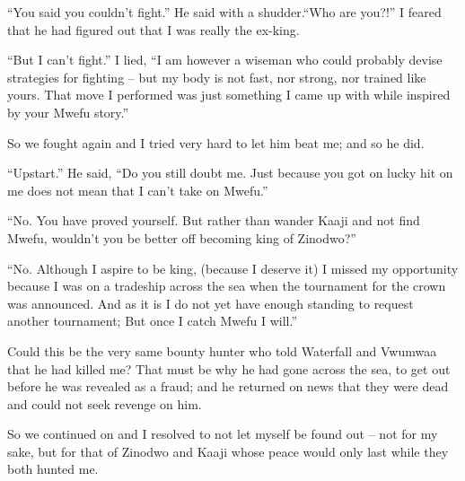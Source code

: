 ``You said you couldn't fight.'' He said with a shudder.``Who are you?!'' I feared that he had figured out that I was really the ex-king.

``But I can't fight.'' I lied, ``I am however a wiseman who could probably devise strategies for fighting -- but my body is not fast, nor strong, nor trained like yours. That move I performed was just something I came up with while inspired by your Mwefu story.''

So we fought again and I tried very hard to let him beat me; and so he did.

``Upstart.'' He said, ``Do you still doubt me. Just because you got on lucky hit on me does not mean that I can't take on Mwefu.''

``No. You have proved yourself. But rather than wander Kaaji and not find Mwefu, wouldn't you be better off becoming king of Zinodwo?''

``No. Although I aspire to be king, (because I deserve it) I missed my opportunity because I was on a tradeship across the sea when the tournament for the crown was announced. And as it is I do not yet have enough standing to request another tournament; But once I catch Mwefu I will.''

Could this be the very same bounty hunter who told Waterfall and Vwumwaa that he had killed me? That must be why he had gone across the sea, to get out before he was revealed as a fraud; and he returned on news that they were dead and could not seek revenge on him.

So we continued on and I resolved to not let myself be found out -- not for my sake, but for that of Zinodwo and Kaaji whose peace would only last while they both hunted me.
